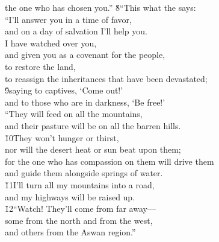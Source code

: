 \begin{poetry}
\poemlll       the one who has chosen you.''
\poeml \v{8}``This what the  says: \\
\poeml ``I'll answer you in a time of favor, \\
\poemll    and on a day of salvation I'll help you. \\
\poeml I have watched over you, \\
\poemll    and given you as a covenant for the people, \\
\poeml to restore the land, \\
\poemll    to reassign the inheritances that have been devastated; \\
\poeml \v{9}saying to captives, `Come out!' \\
\poemll    and to those who are in darkness, `Be free!' \\
\poeml ``They will feed on all the mountains, \\
\poemll    and their pasture will be on all the barren hills. \\
\poeml \v{10}They won't hunger or thirst, \\
\poemll    nor will the desert heat or sun beat upon them; \\
\poeml for the one who has compassion on them will drive them \\
\poemll    and guide them alongside springs of water. \\
\poeml \v{11}I'll turn all my mountains into a road, \\
\poemll    and my highways will be raised up. \\
\poeml \v{12}``Watch! They'll come from far away--- \\
\poemll    some from the north and from the west, \\
\poemlll       and others from the Aswan region.'' \\

\end{poetry}
